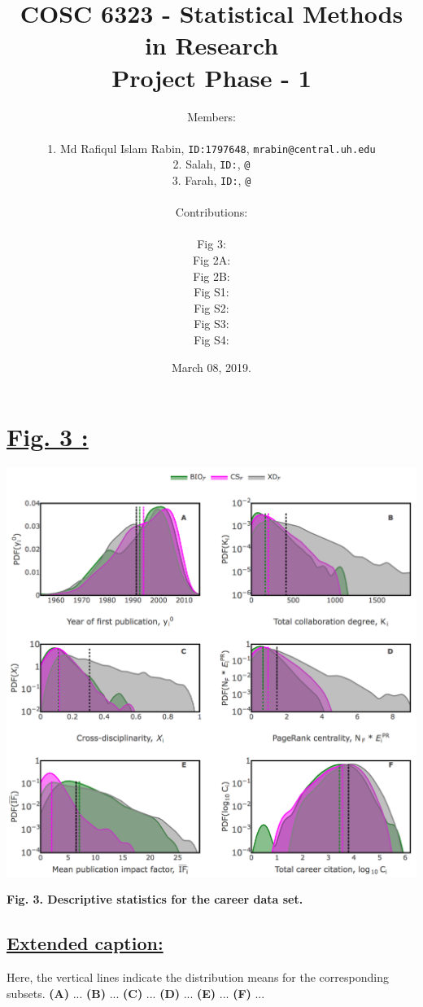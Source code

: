 \documentclass{article}\usepackage[]{graphicx}\usepackage[]{color}
\title{COSC 6323 - Statistical Methods in Research\\Project Phase - 1\\}
\author{%
    Members: \\\\
    1. Md Rafiqul Islam Rabin, \texttt{ID:1797648}, \texttt{mrabin@central.uh.edu}\vspace{2pt} \\
    2. Salah, \texttt{ID:}, \texttt{@}\vspace{2pt} \\
    3. Farah, \texttt{ID:}, \texttt{@}\vspace{2pt} \\
    \\ Contributions: \\\\
    Fig 3: \\
    Fig 2A: \\
    Fig 2B: \\
    Fig S1: \\
    Fig S2: \\
    Fig S3: \\
    Fig S4: \\
}
\date{March 08, 2019.}
\begin{document}
\maketitle

\newpage
\section*{\underline{Fig. 3 :}}
\begin{center}
\includegraphics[scale=0.6]{3_plotly.png}
\newline
\par{\textbf{Fig. 3. Descriptive statistics for the career data set.}}
\end{center}
\subsection*{\underline{Extended caption:}}
\par{Here, the vertical lines indicate the distribution means for the corresponding subsets. \textbf{(A)} ... \textbf{(B)} ... \textbf{(C)} ... \textbf{(D)} ... \textbf{(E)} ... \textbf{(F)} ... }

\newpage
\end{document}
